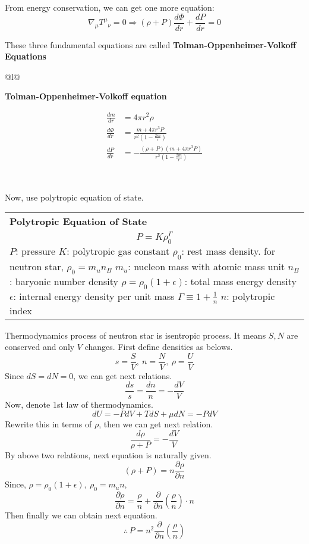 \documentclass[]{book}
\begin{document}
From energy conservation, we can get one more equation:
\[\nabla_\mu {T^\mu}_\nu = 0 \Rightarrow (\rho + P) \frac{d\Phi}{dr} + \frac{dP}{dr} = 0\]

These three fundamental equations are called \textbf{Tolman-Oppenheimer-Volkoff Equations}

\begin{longtable}[]{@{}l@{}}
\toprule
\endhead
\begin{minipage}[t]{0.97\columnwidth}\raggedright
\textbf{Tolman-Oppenheimer-Volkoff equation}\strut
\end{minipage}\tabularnewline
\begin{minipage}[t]{0.97\columnwidth}\raggedright
\[\begin{aligned}
\frac{dm}{dr} &= 4\pi r^2 \rho \\
\frac{d\Phi}{dr} &= \frac{ m + 4\pi r^3 P}{r^2 (1 - \frac{2m}{r})} \\
\frac{dP}{dr} &= - \frac{(\rho + P)(m + 4\pi r^3 P)}{r^2 (1 - \frac{2m}{r})}
\end{aligned}\]\strut
\end{minipage}\tabularnewline
\bottomrule
\end{longtable}

~

Now, use polytropic equation of state.

\begin{longtable}[]{@{}l@{}}
\toprule
\endhead
\begin{minipage}[t]{0.97\columnwidth}\raggedright
\textbf{Polytropic Equation of State}\strut
\end{minipage}\tabularnewline
\begin{minipage}[t]{0.97\columnwidth}\raggedright
\[P = K \rho_0^\Gamma\]
\(P\): pressure
\(K\): polytropic gas constant
\(\rho_0\): rest mass density. for neutron star, \(\rho_0 = m_u n_B\)
\(m_u\): nucleon mass with atomic mass unit
\(n_B\): baryonic number density
\(\rho = \rho_0(1 + \epsilon)\): total mass energy density
\(\epsilon\): internal energy density per unit mass
\(\Gamma \equiv 1 + \frac{1}{n}\)
\(n\): polytropic index\strut
\end{minipage}\tabularnewline
\bottomrule
\end{longtable}

Thermodynamics process of neutron star is isentropic process.
It means \(S, N\) are conserved and only \(V\) changes.
First define densities as belows.
\[s = \frac{S}{V},~ n = \frac{N}{V},~ \rho = \frac{U}{V}\]
Since \(dS = dN = 0\), we can get next relations.
\[\frac{ds}{s} = \frac{dn}{n} = - \frac{dV}{V}\]
Now, denote 1st law of thermodynamics.
\[dU = -PdV + TdS + \mu dN = -PdV\]
Rewrite this in terms of \(\rho\), then we can get next relation.
\[\frac{d\rho}{\rho + P} = - \frac{dV}{V}\]
By above two relations, next equation is naturally given.
\[\left(\rho + P\right) = n \frac{\partial \rho}{\partial n}\]
Since, \(\rho = \rho_0 (1+\epsilon),~ \rho_0 = m_u n\),
\[\frac{\partial \rho}{\partial n} = \frac{\rho}{n} + \frac{\partial}{\partial n}\left(\frac{\rho}{n}\right) \cdot n\]
Then finally we can obtain next equation.
\[\therefore \, P = n^2 \frac{\partial}{\partial n} \left(\frac{\rho}{n}\right)\]
\end{document}
